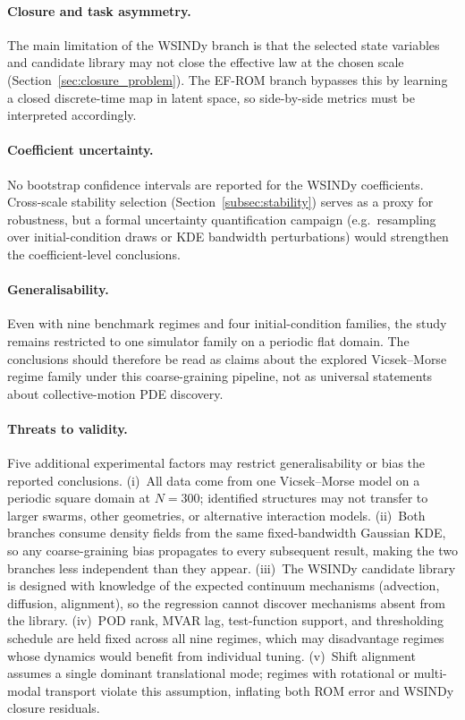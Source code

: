 \paragraph{Closure and task asymmetry.}
The main limitation of the WSINDy branch is that the selected state
variables and candidate library may not close the effective law at the
chosen scale (Section~\ref{sec:closure_problem}).  The EF-ROM branch
bypasses this by learning a closed discrete-time map in latent space,
so side-by-side metrics must be interpreted accordingly.

\paragraph{Coefficient uncertainty.}
No bootstrap confidence intervals are reported for the WSINDy
coefficients.  Cross-scale stability selection
(Section~\ref{subsec:stability}) serves as a proxy for
robustness, but a formal uncertainty quantification campaign (e.g.\
resampling over initial-condition draws or KDE bandwidth
perturbations) would strengthen the coefficient-level conclusions.

\paragraph{Generalisability.}
Even with nine benchmark regimes and four initial-condition families, the
study remains restricted to one simulator family on a periodic flat domain.
The conclusions should therefore be read as claims about the explored
Vicsek--Morse~\cite{vicsek1995vicsek,dorsogna2006morse} regime family under this coarse-graining pipeline, not as
universal statements about collective-motion PDE discovery.

\paragraph{Threats to validity.}
Five additional experimental factors may restrict generalisability or bias the
reported conclusions.
(i)~All data come from one Vicsek--Morse model on a periodic square
domain at $N{=}300$; identified structures may not transfer to
larger swarms, other geometries, or alternative interaction models.
(ii)~Both branches consume density fields from the same fixed-bandwidth
Gaussian KDE, so any coarse-graining bias propagates to every subsequent
result, making the two branches less independent than they appear.
(iii)~The WSINDy candidate library is designed with knowledge of the
expected continuum mechanisms (advection, diffusion, alignment), so the
regression cannot discover mechanisms absent from the library.
(iv)~POD rank, MVAR lag, test-function support, and thresholding schedule
are held fixed across all nine regimes, which may disadvantage regimes
whose dynamics would benefit from individual tuning.
(v)~Shift alignment assumes a single dominant translational mode; regimes
with rotational or multi-modal transport violate this assumption, inflating
both ROM error and WSINDy closure residuals.

